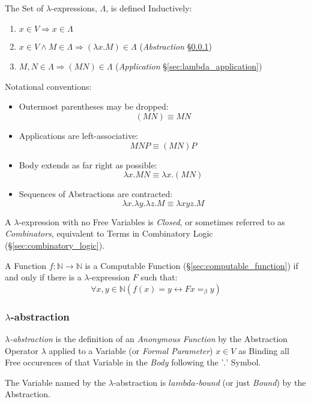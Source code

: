 The Set of $\lambda$-expressions, $\Lambda$, is defined Inductively:
\begin{enumerate}
  \item $x \in V \Rightarrow x \in \Lambda$
  \item $x \in V \wedge M \in \Lambda \Rightarrow (\lambda x.M) \in
    \Lambda$ (\emph{Abstraction} \S\ref{sec:lambda_abstraction})
  \item $M,N \in \Lambda \Rightarrow (M N) \in \Lambda$
    (\emph{Application} \S\ref{sec:lambda_application})
\end{enumerate}
Notational conventions:
\begin{itemize}
  \item Outermost parentheses may be dropped:
    \[
      (M N) \equiv M N
    \]
  \item Applications are left-associative:
    \[
      M N P \equiv (M N) P
    \]
  \item Body extends as far right as possible:
    \[
      \lambda x.M N \equiv \lambda x.(M N)
    \]
  \item Sequences of Abstractions are contracted:
    \[
      \lambda x.\lambda y.\lambda z.M \equiv
      \lambda xyz.M
    \]
\end{itemize}

A $\lambda$-expression with no Free Variables is \emph{Closed}, or
sometimes referred to as \emph{Combinators}, equivalent to Terms in
Combinatory Logic (\S\ref{sec:combinatory_logic}).

A Function $f : \mathbb{N} \rightarrow \mathbb{N}$ is a Computable
Function (\S\ref{sec:computable_function}) if and only if there is a
$\lambda$-expression $F$ such that:
\[
  \forall x,y \in \mathbb{N} (f(x)=y \leftrightarrow F x =_\beta y)
\]



\subsubsection{$\lambda$-abstraction}\label{sec:lambda_abstraction}

\emph{$\lambda$-abstraction} is the definition of an \emph{Anonymous
  Function} by the Abstraction Operator $\lambda$ applied to a
Variable (or \emph{Formal Parameter}) $x \in V$ as Binding all Free
occurences of that Variable in the \emph{Body} following the '$.$'
Symbol.

The Variable named by the $\lambda$-abstraction is
\emph{$lambda$-bound} (or just \emph{Bound}) by the Abstraction.




